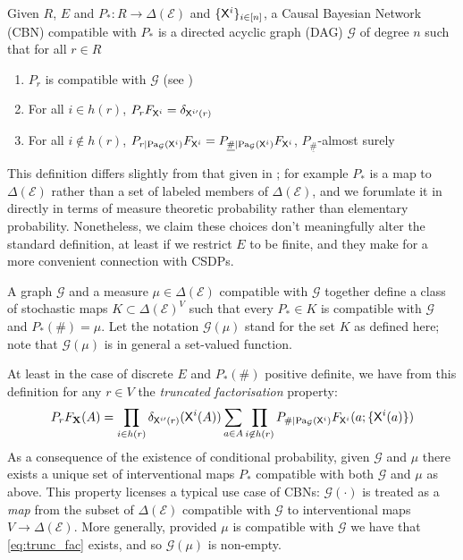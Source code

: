 \begin{definition}\label{def:CBN}

Given $R$, $E$ and $P_*:R\to \Delta(\mathcal{E})$ and $\{\mathsf{X}^i\}_{i\in [n]}$, a Causal Bayesian Network (CBN) compatible with $P_*$ is a directed acyclic graph (DAG) $\mathcal{G}$ of degree $n$ such that for all $r\in R$

\begin{enumerate}
    \item $P_r$ is compatible with $\mathcal{G}$ (see \citet{pearl_causality:_2009})
    \item For all $i\in h(r)$, $P_r F_{\mathsf{X}^i}=\delta_{\mathsf{X}^{i\prime}(r)}$
    \item For all $i\not \in h(r)$, $P_{r|\text{Pa}_{\mathcal{G}}(\mathsf{X}^i)} F_{\mathsf{X}^i}=P_{\underline{\#}|\text{Pa}_{\mathcal{G}}(\mathsf{X}^i)}F_{\mathsf{X}^i} $, $P_{\underline{\#}}$-almost surely
\end{enumerate}
\end{definition}

This definition differs slightly from that given in \citet{pearl_causality:_2009}; for example $P_*$ is a map to $\Delta(\mathcal{E})$ rather than a set of labeled members of $\Delta(\mathcal{E})$, and we forumlate it in directly in terms of measure theoretic probability rather than elementary probability. Nonetheless, we claim these choices don't meaningfully alter the standard definition, at least if we restrict $E$ to be finite, and they make for a more convenient connection with CSDPs.

A graph $\mathcal{G}$ and a measure $\mu\in \Delta(\mathcal{E})$ compatible with $\mathcal{G}$ together define a class of stochastic maps $K\subset \Delta(\mathcal{E})^V$ such that every $P_*\in K$ is compatible with $\mathcal{G}$ and $P_*(\#)=\mu$. Let the notation $\mathcal{G}(\mu)$ stand for the set $K$ as defined here; note that $\mathcal{G}(\mu)$ is in general a set-valued function.

At least in the case of discrete $E$ and $P_*(\#)$ positive definite, we have from this definition for any $r\in V$ the \emph{truncated factorisation} property:
\begin{align}
	P_r F_{\mathbf{X}}(A) = \prod_{i\in h(r)} \delta_{\mathsf{X}^{i\prime} (r)} (\mathsf{X}^i(A)) \sum_{a\in A} \prod_{i\not \in h(r)} P_{\#|\text{Pa}_{\mathcal{G}}(\mathsf{X}^i)} F_{\mathsf{X}^i} (a;\{\mathsf{X}^i(a)\})\label{eq:trunc_fac}
\end{align}
As a consequence of the existence of conditional probability, given $\mathcal{G}$ and $\mu$ there exists a unique set of interventional maps $P_*$ compatible with both $\mathcal{G}$ and $\mu$ as above. This property licenses a typical use case of CBNs: $\mathcal{G}(\cdot)$ is treated as a \emph{map} from the subset of $\Delta(\mathcal{E})$ compatible with $\mathcal{G}$ to interventional maps $V\to \Delta(\mathcal{E})$. More generally, provided $\mu$ is compatible with $\mathcal{G}$ we have that \ref{eq:trunc_fac} exists, and so $\mathcal{G}(\mu)$ is non-empty.

